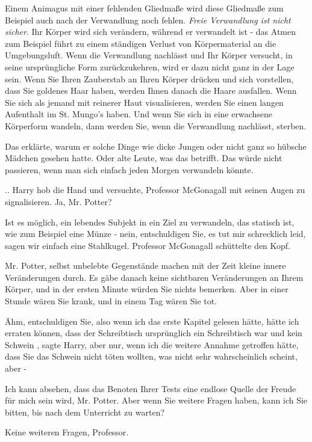 Einem Animagus mit einer fehlenden Gliedmaße wird diese Gliedmaße zum Beispiel
auch nach der Verwandlung noch fehlen. \emph{Freie Verwandlung ist nicht
sicher}. Ihr Körper wird sich verändern, während er verwandelt ist - das Atmen
zum Beispiel führt zu einem ständigen Verlust von Körpermaterial an die
Umgebungsluft. Wenn die Verwandlung nachlässt und Ihr Körper versucht, in seine
ursprüngliche Form zurückzukehren, wird er dazu nicht ganz in der Lage sein.
Wenn Sie Ihren Zauberstab an Ihren Körper drücken und sich vorstellen, dass Sie
goldenes Haar haben, werden Ihnen danach die Haare ausfallen. Wenn Sie sich als
jemand mit reinerer Haut visualisieren, werden Sie einen langen Aufenthalt im
St. Mungo's haben. Und wenn Sie sich in eine erwachsene Körperform wandeln, dann
werden Sie, wenn die Verwandlung nachlässt, sterben.\grqq{}

Das erklärte, warum er solche Dinge wie dicke Jungen oder nicht ganz so hübsche
Mädchen gesehen hatte. Oder alte Leute, was das betrifft. Das würde nicht
passieren, wenn man sich einfach jeden Morgen verwandeln könnte.

.. Harry hob die Hand und versuchte, Professor McGonagall mit seinen Augen zu
signalisieren. \glqq Ja, Mr. Potter?\grqq{}

\glqq Ist es möglich, ein lebendes Subjekt in ein Ziel zu verwandeln, das
statisch ist, wie zum Beispiel eine Münze - nein, entschuldigen Sie, es tut mir
schrecklich leid, sagen wir einfach eine Stahlkugel.\grqq{} Professor McGonagall
schüttelte den Kopf.

\glqq Mr. Potter, selbst unbelebte Gegenstände machen mit der Zeit kleine innere
Veränderungen durch. Es gäbe danach keine sichtbaren Veränderungen an Ihrem
Körper, und in der ersten Minute würden Sie nichts bemerken. Aber in einer
Stunde wären Sie krank, und in einem Tag wären Sie tot.\grqq{}

\glqq Ähm, entschuldigen Sie, also wenn ich das erste Kapitel gelesen hätte,
hätte ich erraten können, dass der Schreibtisch ursprünglich ein Schreibtisch
war und kein Schwein\grqq{} , sagte Harry, \glqq aber nur, wenn ich die weitere
Annahme getroffen hätte, dass Sie das Schwein nicht töten wollten, was nicht
sehr wahrscheinlich scheint, aber -\grqq{}

\glqq Ich kann absehen, dass das Benoten Ihrer Tests eine endlose Quelle der
Freude für mich sein wird, Mr. Potter. Aber wenn Sie weitere Fragen haben, kann
ich Sie bitten, bis nach dem Unterricht zu warten?\grqq{}

\glqq Keine weiteren Fragen, Professor.\grqq{}

